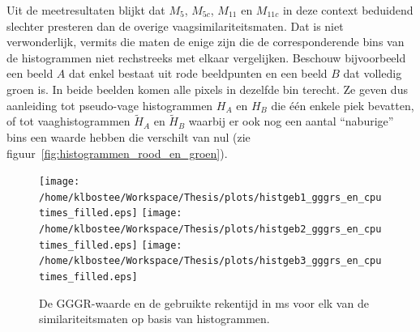 Uit de meetresultaten blijkt dat $M_5$, $M_{5c}$, $M_{11}$ en $M_{11c}$ in deze context
beduidend slechter presteren dan de overige vaagsimilariteitsmaten. Dat is niet
verwonderlijk, vermits die maten de enige zijn die de corresponderende bins van de histogrammen 
niet rechstreeks met elkaar vergelijken. Beschouw bijvoorbeeld een beeld $A$ dat enkel bestaat
uit rode beeldpunten en een beeld $B$ dat volledig groen is. In beide beelden komen alle
pixels in dezelfde bin terecht. Ze geven dus aanleiding tot pseudo-vage histogrammen $H_A$ en $H_B$  
die \'e\'en enkele piek bevatten, of tot vaaghistogrammen $\widetilde{H}_A$ en $\widetilde{H}_B$ 
waarbij er ook nog een aantal ``naburige'' bins een waarde hebben die verschilt van nul 
(zie figuur~\ref{fig:histogrammen_rood_en_groen}). 
\begin{figure}[p]
\centering
\texttt{[image: /home/klbostee/Workspace/Thesis/plots/histgeb1\_gggrs\_en\_cputimes\_filled.eps]} 
\texttt{[image: /home/klbostee/Workspace/Thesis/plots/histgeb2\_gggrs\_en\_cputimes\_filled.eps]}
\texttt{[image: /home/klbostee/Workspace/Thesis/plots/histgeb3\_gggrs\_en\_cputimes\_filled.eps]}
\vspace{1pt}
\caption{\label{fig:histgeb_gggrs_en_cputimes}De GGGR-waarde en de gebruikte rekentijd in ms voor elk 
van de similariteitsmaten op basis van histogrammen.}
\end{figure}
%
